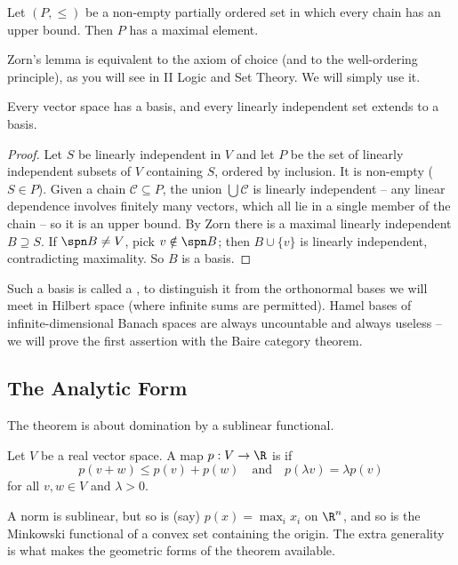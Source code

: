 \begin{theorem}
	Let $(P, \leq)$ be a non-empty partially ordered set in which every chain has an upper bound. Then $P$ has a maximal element.
\end{theorem}

Zorn's lemma is equivalent to the axiom of choice (and to the well-ordering principle), as you will see in II Logic and Set Theory. We will simply use it.

\begin{proposition}
	Every vector space has a basis, and every linearly independent set extends to a basis.
\end{proposition}

\begin{proof}
	Let $S$ be linearly independent in $V$ and let $P$ be the set of linearly independent subsets of $V$ containing $S$, ordered by inclusion. It is non-empty ($S \in P$). Given a chain $\mathcal{C} \subseteq P$, the union $\bigcup \mathcal{C}$ is linearly independent -- any linear dependence involves finitely many vectors, which all lie in a single member of the chain -- so it is an upper bound. By Zorn there is a maximal linearly independent $B \supseteq S$. If $\spn B \neq V$, pick $v \notin \spn B$; then $B \cup \{v\}$ is linearly independent, contradicting maximality. So $B$ is a basis.
\end{proof}

Such a basis is called a , to distinguish it from the orthonormal bases we will meet in Hilbert space (where infinite sums are permitted). Hamel bases of infinite-dimensional Banach spaces are always uncountable and always useless -- we will prove the first assertion with the Baire category theorem.

\subsection{The Analytic Form}

The theorem is about domination by a sublinear functional.

\begin{definition}
	Let $V$ be a real vector space. A map $p : V \to \R$ is  if
	$$p(v + w) \leq p(v) + p(w) \quad \text{and} \quad p(\lambda v) = \lambda p(v)$$
	for all $v, w \in V$ and $\lambda > 0$.
\end{definition}

A norm is sublinear, but so is (say) $p(x) = \max_i x_i$ on $\R^n$, and so is the Minkowski functional of a convex set containing the origin. The extra generality is what makes the geometric forms of the theorem available.

